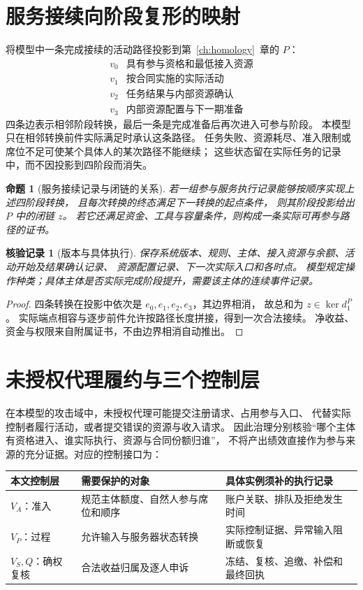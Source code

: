 \documentclass[12pt,a4paper,openany]{report}
\newtheorem{proposition}{命题}[chapter]
\newtheorem{Certificate}{核验记录}[chapter]
\begin{document}
\begin{CJK*}{UTF8}{gkai}
\section{服务接续向阶段复形的映射}
将模型中一条完成接续的活动路径投影到第~\ref{ch:homology}~章的 \(P\)：
\[
\begin{array}{c|l}
v_0&\text{具有参与资格和最低接入资源}\\
v_1&\text{按合同实施的实际活动}\\
v_2&\text{任务结果与内部资源确认}\\
v_3&\text{内部资源配置与下一期准备}
\end{array}
\]
四条边表示相邻阶段转换，最后一条是完成准备后再次进入可参与阶段。
本模型只在相邻转换前件实际满足时承认这条路径。
任务失败、资源耗尽、准入限制或席位不足可使某个具体人的某次路径不能继续；
这些状态留在实际任务的记录中，而不因投影到四阶段而消失。

\begin{proposition}[服务接续记录与闭链的关系]
\label{prop:service-cycle}
若一组参与服务执行记录能够按顺序实现上述四阶段转换，
且每次转换的终态满足下一转换的起点条件，
则其阶段投影给出 \(P\) 中的闭链 \(z\)。
若它还满足资金、工具与容量条件，则构成一条实际可再参与路径的证书。
\end{proposition}
\begin{Certificate}[版本与具体执行]
保存系统版本、规则、主体、接入资源与余额、活动开始及结果确认记录、
资源配置记录、下一次实际入口和各时点。
模型规定操作种类；具体主体是否实际完成阶段提升，需要该主体的连续事件记录。
\end{Certificate}
\begin{proof}
四条转换在投影中依次是 \(e_0,e_1,e_2,e_3\)，其边界相消，
故总和为 \(z\in\ker d_1^P\)。
实际端点相容与逐步前件允许按路径长度拼接，得到一次合法接续。
净收益、资金与权限来自附属证书，不由边界相消自动推出。
\end{proof}

\section{未授权代理履约与三个控制层}
在本模型的攻击域中，未授权代理可能提交注册请求、占用参与入口、
代替实际控制者履行活动，或者提交错误的资源与收入请求。
因此治理分别核验“哪个主体有资格进入、谁实际执行、资源与合同份额归谁”，
不将产出绩效直接作为参与来源的充分证据。对应的控制接口为：

\begin{center}
\begin{tabular}{P{3.2cm}P{5.2cm}P{6.0cm}}
\toprule
本文控制层 & 需要保护的对象 & 具体实例须补的执行记录\\
\midrule
\(V_A\)：准入 & 规范主体额度、自然人参与席位和顺序 & 账户关联、排队及拒绝发生时间\\
\(V_P\)：过程 & 允许输入与服务器状态转换 & 实际控制证据、异常输入阻断或恢复\\
\(V_S,Q\)：确权复核 & 合法收益归属及逐人申诉 & 冻结、复核、追缴、补偿和最终回执\\
\bottomrule
\end{tabular}
\end{center}


\end{CJK*}
\end{document}
